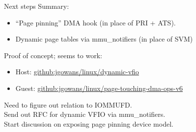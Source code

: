 \documentclass{beamer}
\begin{document}
\begin{frame}{Next steps}
  Summary:
  \begin{itemize}
    \item ``Page pinning'' DMA hook (in place of PRI + ATS).
    \item Dynamic page tables via mmu\_notifiers (in place of SVM)
  \end{itemize}
  Proof of concept; seems to work:
  \begin{itemize}
    \item Host: \href{https://github.com/jgowans/linux/tree/dynamic-vfio}{github:jgowans/linux/dynamic-vfio}
    \item Guest: \href{https://github.com/jgowans/linux/tree/page-touching-dma-ops-v6}{github:jgowans/linux/page-touching-dma-ops-v6}
  \end{itemize}
  Need to figure out relation to IOMMUFD.\\
 
  Send out RFC for dynamic VFIO via mmu\_notifiers.\\
 
  Start discussion on exposing page pinning device model.
\end{frame}
\end{document}
